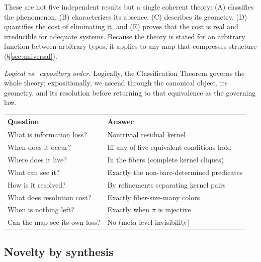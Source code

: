 \documentclass[11pt,a4paper]{article}
\theoremstyle{plain}
\theoremstyle{definition}
\theoremstyle{remark}
\newcommand{\compare}{\pi}
\begin{document}
\noindent
These are not five independent results but a single coherent theory: (A)
classifies the phenomenon, (B) characterizes its absence, (C) describes its
geometry, (D) quantifies the cost of eliminating it, and (E) proves that the
cost is real and irreducible for adequate systems. Because the theory is
stated for an arbitrary function between arbitrary types, it applies to any
map that compresses structure (\S\ref{sec:universal}).

\noindent\textit{Logical vs.\ expository order.}
Logically, the Classification Theorem governs the whole theory; expositionally,
we ascend through the canonical object, its geometry, and its resolution
before returning to that equivalence as the governing law.

\begin{center}
\begin{tabular}{ll}
\toprule
\textbf{Question} & \textbf{Answer} \\
\midrule
What is information loss? & Nontrivial residual kernel \\
When does it occur? & Iff any of five equivalent conditions hold \\
Where does it live? & In the fibers (complete kernel cliques) \\
What can see it? & Exactly the non-bare-determined predicates \\
How is it resolved? & By refinements separating kernel pairs \\
What does resolution cost? & Exactly fiber-size-many colors \\
When is nothing left? & Exactly when $\compare$ is injective \\
Can the map see its own loss? & No (meta-level invisibility) \\
\bottomrule
\end{tabular}
\end{center}

\subsection{Novelty by synthesis}
\end{document}
